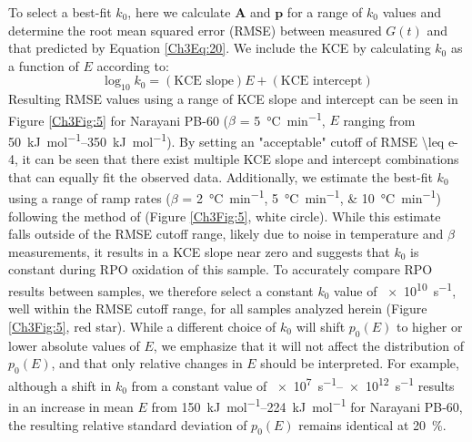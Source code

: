 To select a best-fit $k_{0}$, here we calculate $\mathbf{A}$ and $\mathbf{p}$ for a range of $k_{0}$ values and determine the root mean squared error (RMSE) between measured $G(t)$ and that predicted by Equation \ref{Ch3Eq:20}. We include the KCE by calculating $k_{0}$ as a function of $E$ according to:
%
\begin{equation}\label{Ch3Eq:21}
	\log_{10} k_{0} = (\text{KCE slope})E + (\text{KCE intercept})
\end{equation}
%
Resulting RMSE values using a range of KCE slope and intercept can be seen in Figure \ref{Ch3Fig:5} for Narayani PB-60 ($\beta$ = \SI{5}{\celsius.min^{-1}}, $E$ ranging from \SIrange{50}{350}{kJ.mol^{-1}}). By setting an "acceptable" cutoff of RMSE \num{\leq e-4}, it can be seen that there exist multiple KCE slope and intercept combinations that can equally fit the observed data. Additionally, we estimate the best-fit $k_{0}$ using a range of ramp rates ($\beta$ = \SIlist{2;5;10}{\celsius.min^{-1}}) following the method of \citet{Miura:1998jf} (Figure \ref{Ch3Fig:5}, white circle). While this estimate falls outside of the RMSE cutoff range, likely due to noise in temperature and $\beta$ measurements, it results in a KCE slope near zero and suggests that $k_{0}$ is constant during RPO oxidation of this sample. To accurately compare RPO results between samples, we therefore select a constant $k_{0}$ value of \SI{e10}{s^{-1}}, well within the RMSE cutoff range, for all samples analyzed herein (Figure \ref{Ch3Fig:5}, red star). While a different choice of $k_{0}$ will shift $p_{0}(E)$ to higher or lower absolute values of $E$, we emphasize that it will not affect the distribution of $p_{0}(E)$, and that only relative changes in $E$ should be interpreted. For example, although a shift in $k_{0}$ from a constant value of \SIrange{e7}{e12}{s^{-1}} results in an increase in mean $E$ from \SIrange{150}{224}{kJ.mol^{-1}} for Narayani PB-60, the resulting relative standard deviation of $p_{0}(E)$ remains identical at \SI{20}{\%}.
 
